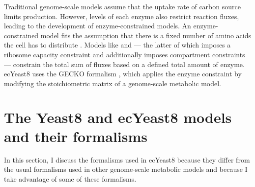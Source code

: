 Traditional genome-scale models assume that the uptake rate of carbon source limits production.
However, levels of each enzyme also restrict reaction fluxes, leading to the development of enzyme-constrained models.
An enzyme-constrained model fits the assumption that there is a fixed number of amino acids the cell has to distribute \parencite{weisseMechanisticLinksCellular2015}.
Models like \textcite{sanchezImprovingPhenotypePredictions2017} and \textcite{elsemmanWholecellModelingYeast2022} --- the latter of which imposes a ribosome capacity constraint and additionally imposes compartment constraints --- constrain the total sum of fluxes based on a defined total amount of enzyme.
ecYeast8 uses the GECKO formalism \parencite{sanchezImprovingPhenotypePredictions2017}, which applies the enzyme constraint by modifying the stoichiometric matrix of a genome-scale metabolic model.

\section{The Yeast8 and ecYeast8 models and their formalisms}
\label{sec:model-yeast8}

In this section, I discuss the formalisms used in ecYeast8 because they differ from the usual formalisms used in other genome-scale metabolic models and because I take advantage of some of these formalisms.

